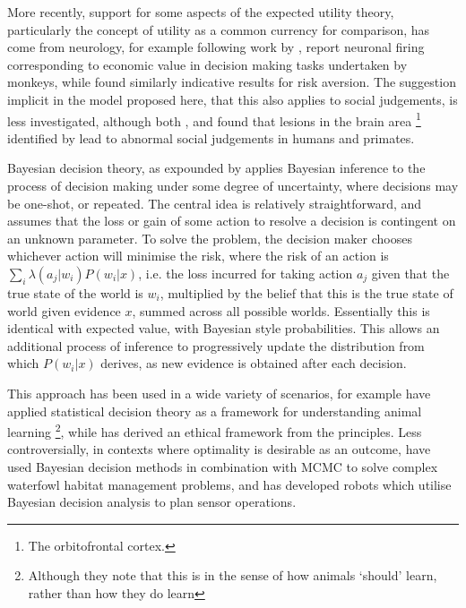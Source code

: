 More recently, support for some aspects of the expected utility theory,
particularly the concept of utility as a common currency for comparison,
has come from neurology, for example following work by \citet{Platt1999},
\citet{Padoa-Schioppa2006,Padoa-Schioppa2008} report neuronal firing
corresponding to economic value in decision making tasks undertaken
by monkeys, while \citet{Christopoulos2009} found similarly indicative
results for risk aversion. The suggestion implicit in the model proposed
here, that this also applies to social judgements, is less investigated,
although both \citet{Watson2012}, and \citet{Willis2010} found that
lesions in the brain area%
\footnote{The orbitofrontal cortex.%
} identified by \citeauthor{Padoa-Schioppa2006} lead to abnormal social
judgements in humans and primates.

Bayesian decision theory, as expounded by \citet{Robbins1964} applies
Bayesian inference to the process of decision making under some degree
of uncertainty, where decisions may be one-shot, or repeated.
The central idea is relatively straightforward, and assumes that the
loss or gain of some action to resolve a decision is contingent on
an unknown parameter. To solve the problem, the decision maker chooses
whichever action will minimise the risk, where the risk of an action
is $\underset{i}{\sum}\lambda(a_{j}|w_{i})P(w_{i}|x)$, i.e. the loss
incurred for taking action $a_{j}$ given that the true state of the
world is $w_{i}$, multiplied by the belief that this is the true
state of world given evidence $x$, summed across all possible worlds.
Essentially this is identical with expected value, with Bayesian style
probabilities. This allows an additional process of inference to progressively
update the distribution from which $P(w_{i}|x)$ derives, as new evidence
is obtained after each decision. 

This approach has been used in a wide variety of scenarios, for example
\citet{McNamara1980} have applied statistical decision theory as
a framework for understanding animal learning%
\footnote{Although they note that this is in the sense of how animals `should'
learn, rather than how they do learn%
}, while \citet{Harsanyi1978} has derived an ethical framework from
the principles. Less controversially, in contexts where optimality
is desirable as an outcome, \citet{Survey2003} have used Bayesian
decision methods in combination with \ac{MCMC} to solve complex waterfowl
habitat management problems, and \citet{Kristensen1997} has developed
robots which utilise Bayesian decision analysis to plan sensor operations.

